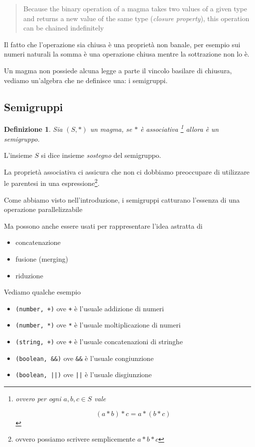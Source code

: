 \documentclass[12pt]{article}
\newtheorem{definition}{Definizione}
\begin{document}
\begin{quote}
Because the binary operation of a magma takes two values of a given type and returns a new value of the same type (\emph{closure property}),
this operation can be chained indefinitely
\end{quote}

Il fatto che l'operazione sia chiusa è una proprietà non banale,
per esempio sui numeri naturali la somma è una operazione chiusa mentre la sottrazione non lo è.

Un magma non possiede alcuna legge a parte il vincolo basilare di chiusura, vediamo un'algebra che ne definisce una: i semigruppi.

\subsection{Semigruppi}

\begin{definition}
Sia $(S, *)$ un magma, se $*$ è associativa \footnote{ovvero per ogni $a, b, c \in S$ vale

$$
(a * b) * c = a * ( b * c )
$$
} allora è un \emph{semigruppo}.
\end{definition}

L'insieme $S$ si dice insieme \emph{sostegno} del semigruppo.

La proprietà associativa ci assicura che non ci dobbiamo preoccupare di utilizzare le parentesi in una espressione\footnote{ovvero possiamo scrivere semplicemente $a * b * c$}.

Come abbiamo visto nell'introduzione, i semigruppi catturano l'essenza di una operazione parallelizzabile

Ma possono anche essere usati per rappresentare l'idea astratta di

\begin{itemize}
  \item concatenazione
  \item fusione (merging)
  \item riduzione
\end{itemize}

Vediamo qualche esempio

\begin{itemize}
  \item \texttt{(number, +)} ove \texttt{+} è l'usuale addizione di numeri
  \item \texttt{(number, *)} ove \texttt{*} è l'usuale moltiplicazione di numeri
  \item \texttt{(string, +)} ove \texttt{+} è l'usuale concatenazioni di stringhe
  \item \texttt{(boolean, \&\&)} ove \texttt{\&\&} è l'usuale congiunzione
  \item \texttt{(boolean, ||)} ove \texttt{||} è l'usuale disgiunzione
\end{itemize}
\end{document}
